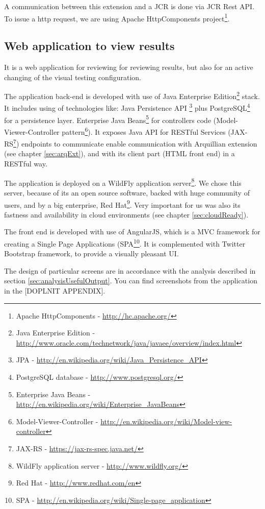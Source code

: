 \documentclass[11pt,oneside,final]{fithesis2}
\begin{document}
    A communication between this extension and a JCR is done via JCR Rest API. To issue a http request, we are using Apache HttpComponents
    project\footnote{Apache HttpComponents - \url{http://hc.apache.org/}}.
 
    \subsection{Web application to view results}
    \label{sec:webManagerAppDesc}
    It is a web application for reviewing for reviewing results, but also for an active changing
    of the visual testing configuration.
    
    The application back-end is developed with use of Java Enterprise Edition\footnote{Java Enterprise Edition - 
    \url{http://www.oracle.com/technetwork/java/javaee/overview/index.html}} stack.
    It includes using of technologies like: Java Persistence API 
    \footnote{JPA - \url{http://en.wikipedia.org/wiki/Java_Persistence_API}} plus 
    PostgreSQL\footnote{PostgreSQL database - \url{http://www.postgresql.org/}} for a persistence
    layer. Enterprise Java Beans\footnote{Enterprise Java Beans - \url{http://en.wikipedia.org/wiki/Enterprise_JavaBeans}} 
    for controllers code (Model-Viewer-Controller 
    pattern\footnote{Model-Viewer-Controller - \url{http://en.wikipedia.org/wiki/Model-view-controller}}).
    It exposes Java API for RESTful Services (JAX-RS\footnote{JAX-RS - \url{https://jax-rs-spec.java.net/}}) endpoints to communicate
    enable communication with Arquillian extension (see chapter \ref{sec:arqExt}), and with its client part (HTML front end) in a
    RESTful way.
    
    The application is deployed on a WildFly application server\footnote{WildFly application server - \url{http://www.wildfly.org/}}.
    We chose this server, because of its an open source software, backed with huge community of users, and by a big enterprise,
    Red Hat\footnote{Red Hat - \url{http://www.redhat.com/en}}. Very important for us was also its fastness and availability in
    cloud environments (see chapter \ref{sec:cloudReady}).
    
    The front end is developed with use of AngularJS, which is a MVC framework for creating a Single Page Applications 
    (SPA\footnote{SPA - \url{http://en.wikipedia.org/wiki/Single-page_application}}. It is complemented with Twitter Bootstrap
    framework, to provide a visually pleasant UI.
    
    The design of particular screens are in accordance with the analysis described in section \ref{sec:analysisUsefulOutput}.
    You can find screenshots from the application in the [DOPLNIT APPENDIX].
    
\end{document}
